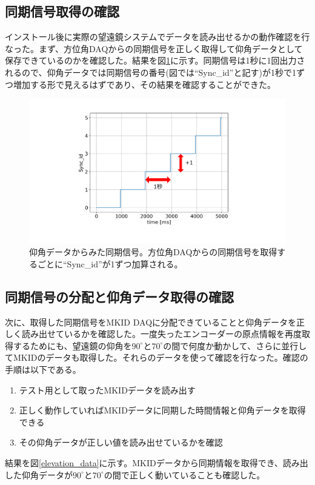 \subsection{同期信号取得の確認}
インストール後に実際の望遠鏡システムでデータを読み出せるかの動作確認を行なった。まず、方位角DAQからの同期信号を正しく取得して仰角データとして保存できているのかを確認した。結果を図\ref{sync_id}に示す。同期信号は1秒に1回出力されるので、仰角データでは同期信号の番号(図では``Sync\_id''と記す)が1秒で1ずつ増加する形で見えるはずであり、その結果を確認することができた。

\begin{figure}[htbp]
  \centering
  \includegraphics[width=0.8\columnwidth]{4_elDAQ/figs/sync_id.pdf}
  \caption{仰角データからみた同期信号。方位角DAQからの同期信号を取得するごとに``Sync\_id''が1ずつ加算される。}
  \label{sync_id}
\end{figure}

\subsection{同期信号の分配と仰角データ取得の確認}
次に、取得した同期信号をMKID DAQに分配できていることと仰角データを正しく読み出せているかを確認した。一度失ったエンコーダーの原点情報を再度取得するためにも、望遠鏡の仰角を$90^{\circ}$と$70^{\circ}$の間で何度か動かして、さらに並行してMKIDのデータも取得した。それらのデータを使って確認を行なった。確認の手順は以下である。
\begin{enumerate}
  \item テスト用として取ったMKIDデータを読み出す
  \item 正しく動作していればMKIDデータに同期した時間情報と仰角データを取得できる
  \item その仰角データが正しい値を読み出せているかを確認
\end{enumerate}

結果を図\ref{elevation_data}に示す。MKIDデータから同期情報を取得でき、読み出した仰角データが$90^{\circ}$と$70^{\circ}$の間で正しく動いていることも確認した。

